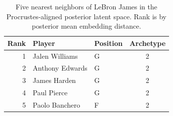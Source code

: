 \begin{table}[htbp]
  \centering\small
  \begin{tabular}{rllc}
    \toprule
    Rank & Player & Position & Archetype \\
    \midrule
    1 & Jalen Williams & G & 2 \\
    2 & Anthony Edwards & G & 2 \\
    3 & James Harden & G & 2 \\
    4 & Paul Pierce & G & 2 \\
    5 & Paolo Banchero & F & 2 \\
    \bottomrule
  \end{tabular}
  \caption{Five nearest neighbors of LeBron James in the Procrustes-aligned posterior latent space. Rank is by posterior mean embedding distance.}
  \label{tab:LeBron_James_neighbors}
\end{table}

